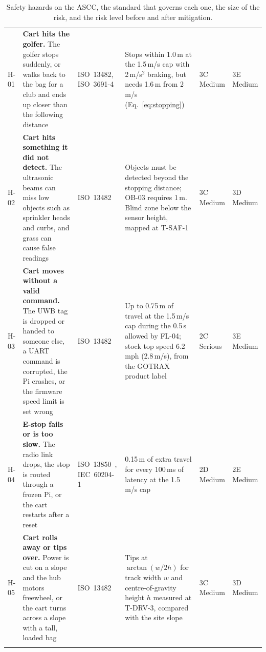 \begin{table}[!htbp]
\centering
\caption{Safety hazards on the \acs{ASCC}, the standard that governs each one, the size of the risk, and the risk level before and after mitigation.}
\label{tab:hazards}
\footnotesize\renewcommand{\arraystretch}{1.0}
\begin{tabularx}{\linewidth}{@{}L{0.35in} Y L{1.02in} Y L{0.5in} L{0.5in}@{}}
 &  &  &  &  &  \\
\midrule
H-01 & \textbf{Cart hits the golfer.} The golfer stops suddenly, or walks back to the bag for a club and ends up closer than the following distance & ISO~13482, ISO~3691-4 & Stops within 1.0\,m at the 1.5\,m/s cap with 2\,m/s$^2$ braking, but needs 1.6\,m from 2\,m/s (Eq.~\ref{eq:stopping}) & 3C Medium & 3E Medium \\
\addlinespace[2pt]
H-02 & \textbf{Cart hits something it did not detect.} The ultrasonic beams can miss low objects such as sprinkler heads and curbs, and grass can cause false readings & ISO~13482 & Objects must be detected beyond the stopping distance; OB-03 requires 1\,m. Blind zone below the sensor height, mapped at T-SAF-1 & 3C Medium & 3D Medium \\
\addlinespace[2pt]
H-03 & \textbf{Cart moves without a valid command.} The \acs{UWB} tag is dropped or handed to someone else, a \acs{UART} command is corrupted, the Pi crashes, or the firmware speed limit is set wrong & ISO~13482 & Up to 0.75\,m of travel at the 1.5\,m/s cap during the 0.5\,s allowed by FL-04; stock top speed 6.2\,mph (2.8\,m/s), from the GOTRAX product label & 2C Serious & 3E Medium \\
\addlinespace[2pt]
H-04 & \textbf{E-stop fails or is too slow.} The radio link drops, the stop is routed through a frozen Pi, or the cart restarts after a reset & ISO~13850~\cite{iso13850}, IEC~60204-1~\cite{iec60204-1} & 0.15\,m of extra travel for every 100\,ms of latency at the 1.5\,m/s cap & 2D Medium & 2E Medium \\
\addlinespace[2pt]
H-05 & \textbf{Cart rolls away or tips over.} Power is cut on a slope and the hub motors freewheel, or the cart turns across a slope with a tall, loaded bag & ISO~13482 & Tips at $\arctan(w/2h)$ for track width $w$ and centre-of-gravity height $h$ measured at T-DRV-3, compared with the site slope & 3C Medium & 3D Medium \\
\addlinespace[2pt]

\end{tabularx}
\end{table}

